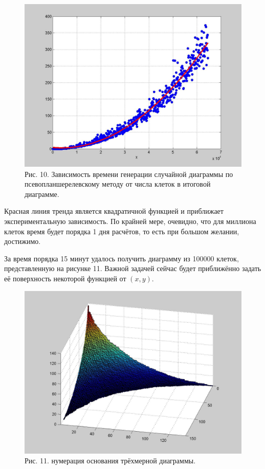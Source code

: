 \documentclass[12pt]{report}
\begin{document}
\begin{figure}[!ht]
\begin{center}
\includegraphics[scale=0.4]{AssymptHooksTime}
\\Рис. 10. Зависимость времени генерации случайной диаграммы по псевопланшерелевскому методу от числа клеток в итоговой диаграмме.
\end{center}
\end{figure}

Красная линия тренда является квадратичной функцией и приближает экспериментальную зависимость. По крайней мере, очевидно, что для миллиона клеток время будет порядка 1 дня расчётов, то есть при большом желании, достижимо.

За время порядка 15 минут удалось получить диаграмму из 100000 клеток, представленную на рисунке 11. Важной задачей сейчас будет приближённо задать её поверхность некоторой функцией от $(x,y)$.

\begin{figure}[!ht]
\begin{center}
\includegraphics[scale=0.4]{3DHooks100000}
\\Рис. 11. нумерация основания трёхмерной диаграммы.
\end{center}
\end{figure}
\end{document}

